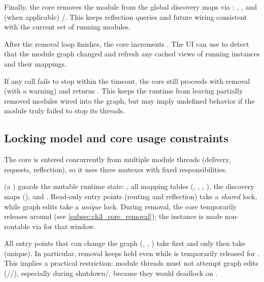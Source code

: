 Finally, the core removes the module from the global discovery maps via :
, , and (when applicable) /.
This keeps reflection queries and future  wiring consistent with the current set of running modules.

After the removal loop finishes, the core increments .
The UI can use  to detect that the module graph changed and refresh any cached views of running instances and their mappings.

If any  call fails to stop within the timeout, the core still proceeds with removal (with a warning) and returns .
This keeps the runtime from leaving partially removed modules wired into the graph, but may imply undefined behavior if the module truly failed to stop its threads.



\subsection{Locking model and core usage constraints} \label{subsec:ch3_core_locking}

The core is entered concurrently from multiple module threads (delivery, requests, reflection), so it uses three mutexes with fixed responsibilities.

 (a ) guards the mutable runtime state:
, all mapping tables (, , , ),
the discovery maps (), and .
Read-only entry points (routing and reflection) take a \emph{shared} lock, while graph edits take a \emph{unique} lock.
During removal, the core temporarily releases  around  (see \autoref{subsec:ch3_core_removal}); the instance is made non-routable via  for that window.

All entry points that can change the graph (, , ) take  first and only then take  (unique).
In particular, removal keeps  held even while  is temporarily released for .
This implies a practical restriction: module threads must not attempt graph edits (//), especially during shutdown/, because they would deadlock on .

